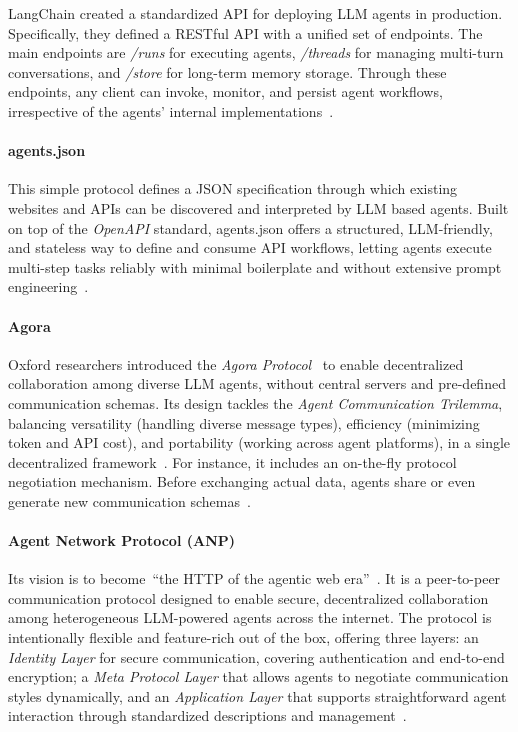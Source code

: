 \documentclass[pdflatex,sn-mathphys-num]{sn-jnl}%
\theoremstyle{thmstyleone}%
\theoremstyle{thmstyletwo}%
\theoremstyle{thmstylethree}%
\begin{document}
LangChain created a standardized API for deploying LLM agents in production. Specifically, they defined a RESTful API with a unified set of endpoints. The main endpoints are \textit{/runs} for executing agents, \textit{/threads} for managing multi-turn conversations, and \textit{/store} for long-term memory storage. Through these endpoints, any client can invoke, monitor, and persist agent workflows, irrespective of the agents’ internal implementations~\cite{lapgit,lapdocsapi}.

\paragraph{agents.json}

This simple protocol defines a JSON specification through which existing websites and APIs can be discovered and interpreted by LLM based agents. Built on top of the \textit{OpenAPI} standard, agents.json offers a structured, LLM-friendly, and stateless way to define and consume API workflows, letting agents execute multi-step tasks reliably with minimal boilerplate and without extensive prompt engineering~\cite{agentsjsongit,agentsjsonintro,agentsjsonschema}.

\paragraph{Agora}

Oxford researchers introduced the \textit{Agora Protocol}~\cite{agoragit} to enable decentralized collaboration among diverse LLM agents, without central servers and pre-defined communication schemas. Its design tackles the \textit{Agent Communication Trilemma}, balancing versatility (handling diverse message types), efficiency (minimizing token and API cost), and portability (working across agent platforms), in a single decentralized framework~\cite{marro2024scalable}. For instance, it includes an on-the-fly protocol negotiation mechanism. Before exchanging actual data, agents share or even generate new communication schemas~\cite{marro2024scalable,agoraspecification}.

\paragraph{Agent Network Protocol (ANP)}

Its vision is to become~\enquote{the HTTP of the agentic web era}~\cite{anpgit}. It is a peer-to-peer communication protocol designed to enable secure, decentralized collaboration among heterogeneous LLM-powered agents across the internet. The protocol is intentionally flexible and feature-rich out of the box, offering three layers: an \textit{Identity Layer} for secure communication, covering authentication and end-to-end encryption; a \textit{Meta Protocol Layer} that allows agents to negotiate communication styles dynamically, and an \textit{Application Layer} that supports straightforward agent interaction through standardized descriptions and management~\cite{anpcommunication,anptechwhitepaper}.
\end{document}
